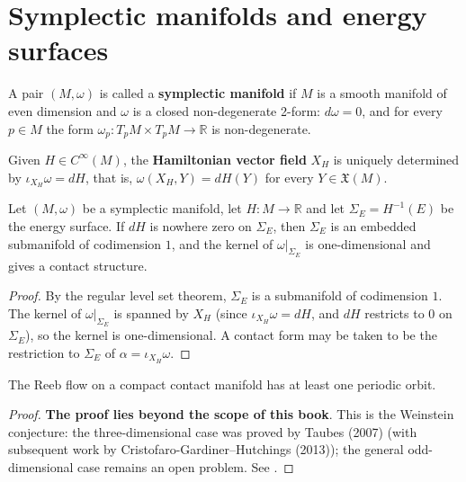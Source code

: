 \section{Symplectic manifolds and energy surfaces}\label{sec:symplectic_energy}

\begin{definition}\label{def:symplectic_manifold}
A pair $(M,\omega)$ is called a \textbf{symplectic manifold} if $M$ is a smooth manifold of even dimension and $\omega$ is a closed non-degenerate 2-form: $d\omega=0$, and for every $p\in M$ the form $\omega_p:T_pM\times T_pM\to\mathbb{R}$ is non-degenerate.
\end{definition}

\begin{definition}\label{def:hamiltonian_vector_field}
Given $H\in C^\infty(M)$, the \textbf{Hamiltonian vector field} $X_H$ is uniquely determined by $\iota_{X_H}\omega=dH$, that is, $\omega(X_H,Y)=dH(Y)$ for every $Y\in\mathfrak{X}(M)$.
\end{definition}

\begin{proposition}\label{prop:energy_surface_contact}
Let $(M,\omega)$ be a symplectic manifold, let $H:M\to\mathbb{R}$ and let $\Sigma_E=H^{-1}(E)$ be the energy surface. If $dH$ is nowhere zero on $\Sigma_E$, then $\Sigma_E$ is an embedded submanifold of codimension $1$, and the kernel of $\omega|_{\Sigma_E}$ is one-dimensional and gives a contact structure.
\end{proposition}

\begin{proof}
By the regular level set theorem, $\Sigma_E$ is a submanifold of codimension $1$. The kernel of $\omega|_{\Sigma_E}$ is spanned by $X_H$ (since $\iota_{X_H}\omega=dH$, and $dH$ restricts to $0$ on $\Sigma_E$), so the kernel is one-dimensional. A contact form may be taken to be the restriction to $\Sigma_E$ of $\alpha=\iota_{X_H}\omega$.
\end{proof}

\begin{theorem}\label{thm:weinstein}
The Reeb flow on a compact contact manifold has at least one periodic orbit.
\end{theorem}

\begin{proof}
\textbf{The proof lies beyond the scope of this book}. This is the Weinstein conjecture: the three-dimensional case was proved by Taubes (2007) (with subsequent work by Cristofaro-Gardiner--Hutchings (2013)); the general odd-dimensional case remains an open problem. See \cite{weinstein1978}.
\end{proof}

